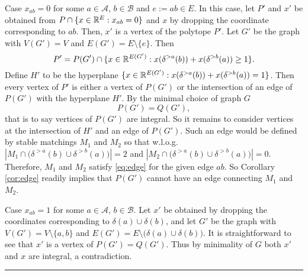 \documentclass[3p,times]{elsarticle}
\newenvironment{proof}{{\bf Proof:  }}{\hfill\rule{2mm}{2mm}}
\begin{document}
\begin{proof}
Case $x_{ab}=0$ for some $a\in \mathcal{A}$, $b\in\mathcal{B}$ and
$e:=ab\in E$. In this case, let $P'$ and $x'$ be obtained from $P\cap\{x\in\mathbb{R}^E: x_{ab}=0\}$ and $x$ by dropping
the coordinate corresponding to $ab$. Then,
$x'$ is a vertex of the polytope $P'$. Let $G'$ be the graph with
$V(G')=V$ and $E(G') = E \setminus \{e\}$. Then 
$$P' = P(G') \cap \{x\in \mathbb{R}^{E(G')}: x(\delta^{>a}(b))+ x(\delta^{>b}(a))\geq1\}.$$
Define $H'$ to be the hyperplane $\{x\in \mathbb{R}^{E(G')}: x(\delta^{>a}(b))+ x(\delta^{>b}(a))=1\}$.  Then every vertex
of $P'$ is either a vertex of $P(G')$ or the intersection of an edge
of $P(G')$ with the hyperplane $H'$. By the minimal choice of graph $G$
$$P(G') = Q(G'),$$ 
that is to say vertices of $P(G')$ are
integral. So it remains to consider
vertices at the intersection of $H'$ and an edge of $P(G')$. Such an
edge would be defined by stable matchings $M_1$ and $M_2$ so that w.l.o.g. $|M_1 \cap \big(\delta^{>a}(b)\cup\delta^{>b}(a)\big)|=2$ and $|M_2 \cap \big(\delta^{>a}(b)\cup\delta^{>b}(a)\big)|=0$. Therefore, $M_1$ and $M_2$ satisfy \eqref{eq:edge} for the given edge $ab$. So
Corollary \ref{cor:edge} readily implies that $P(G')$ cannot
have an edge connecting $M_1$ and $M_2$.

Case $x_{ab}=1$ for some $a\in \mathcal{A}$, $b\in\mathcal{B}$. Let
$x'$ be obtained by dropping the coordinates corresponding to
$\delta(a)\cup\delta(b)$, and let $G'$ be the graph with
$V(G')=V\setminus\{a,b\}$ and
$E(G') = E \setminus \big(\delta(a)\cup\delta(b)\big)$. It is
straightforward to see that $x'$ is a vertex of $P(G')=Q(G')$. Thus by
minimality of $G$ both $x'$ and $x$ are integral, a contradiction.
\end{proof}




\end{document}
